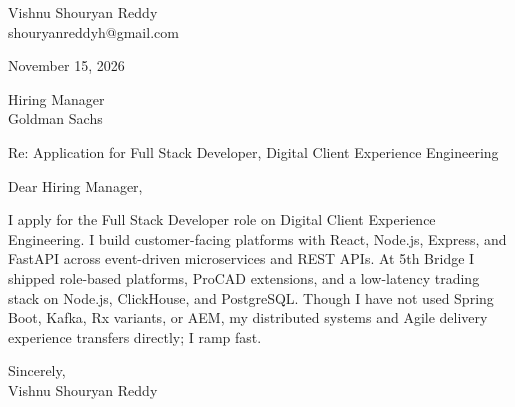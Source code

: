 \documentclass[a4paper,11pt]{article}
\begin{document}
\pagestyle{empty}
Vishnu Shouryan Reddy \\
shouryanreddyh@gmail.com

\vspace{1em}
November 15, 2026

\vspace{1em}
Hiring Manager \\
Goldman Sachs

\vspace{1em}
Re: Application for Full Stack Developer, Digital Client Experience Engineering

\vspace{1em}
Dear Hiring Manager,

\vspace{0.5em}
I apply for the Full Stack Developer role on Digital Client Experience Engineering. I build customer-facing platforms with React, Node.js, Express, and FastAPI across event-driven microservices and REST APIs. At 5th Bridge I shipped role-based platforms, ProCAD extensions, and a low-latency trading stack on Node.js, ClickHouse, and PostgreSQL. Though I have not used Spring Boot, Kafka, Rx variants, or AEM, my distributed systems and Agile delivery experience transfers directly; I ramp fast.

\vspace{1em}
Sincerely, \\
Vishnu Shouryan Reddy
\end{document}
